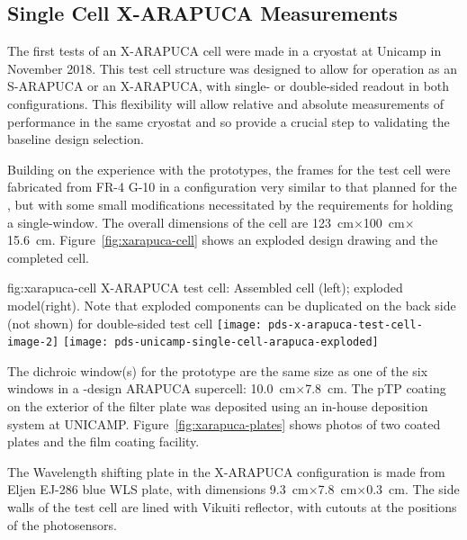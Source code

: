 \subsection{Single Cell X-ARAPUCA Measurements}
\label{sec:xarapuca-unicamp}

The first tests of an X-ARAPUCA cell were made in a cryostat at Unicamp in November 2018. This test cell structure was designed to allow for operation as an S-ARAPUCA or an X-ARAPUCA, with single- or double-sided readout in both configurations.  This flexibility will allow relative and absolute measurements of performance in the same cryostat and so provide a crucial step to validating the baseline design selection.

Building on the experience with the  prototypes, the frames for the test cell were fabricated from FR-4 G-10 in a configuration very similar to that planned for the , but with some small modifications necessitated by the requirements for holding a single-window. The overall dimensions of the cell are \SI{123}{cm}$\times$\SI{100}{cm}$\times$\SI{15.6}{cm}. Figure~\ref{fig:xarapuca-cell} shows an exploded design drawing and the completed cell. 

\begin{dunefigure}{fig:xarapuca-cell}
{X-ARAPUCA test cell:  Assembled cell (left); exploded model(right).  Note that exploded components can be duplicated on the back side (not shown) for double-sided test cell} 
	\texttt{[image: pds-x-arapuca-test-cell-image-2]}
	\texttt{[image: pds-unicamp-single-cell-arapuca-exploded]}
\end{dunefigure}

The dichroic window(s) for the prototype are the same size as one of the six windows in a -design ARAPUCA supercell: \SI{10.0}{cm}$\times$\SI{7.8}{cm}.  The pTP coating on the exterior of the filter plate was deposited using an in-house deposition system at UNICAMP. Figure~\ref{fig:xarapuca-plates} shows photos of two coated plates and the film coating facility. 

The Wavelength shifting plate in the X-ARAPUCA configuration is made from Eljen EJ-286 blue WLS plate, with dimensions \SI{9.3}{cm}$\times$\SI{7.8}{cm}$\times$\SI{0.3}{cm}.  The side walls of the test cell are lined with Vikuiti reflector, with cutouts at the positions of the photosensors.

